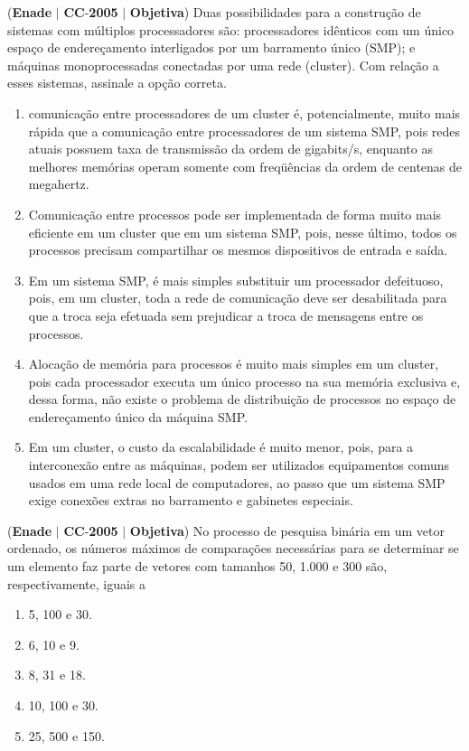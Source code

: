 \documentclass{exam}
\begin{document}
\begin{questions}
\question (\textbf{Enade} $|$ \textbf{CC}-\textbf{2005} $|$ \textbf{Objetiva})
Duas possibilidades para a construção de sistemas com múltiplos
processadores são: processadores idênticos com um único espaço de
endereçamento interligados por um barramento único (SMP); e
máquinas monoprocessadas conectadas por uma rede (cluster). Com
relação a esses sistemas, assinale a opção correta.
	\begin{enumerate}[label=\alph*)]
		\item  comunicação entre processadores de um cluster é,
potencialmente, muito mais rápida que a comunicação entre
processadores de um sistema SMP, pois redes atuais possuem
taxa de transmissão da ordem de gigabits/s, enquanto as
melhores memórias operam somente com freqüências da ordem
de centenas de megahertz.
		\item  Comunicação entre processos pode ser implementada de forma
muito mais eficiente em um cluster que em um sistema SMP,
pois, nesse último, todos os processos precisam compartilhar os
mesmos dispositivos de entrada e saída.
		\item  Em um sistema SMP, é mais simples substituir um processador
defeituoso, pois, em um cluster, toda a rede de comunicação
deve ser desabilitada para que a troca seja efetuada sem
prejudicar a troca de mensagens entre os processos.
		\item  Alocação de memória para processos é muito mais simples em
um cluster, pois cada processador executa um único processo na
sua memória exclusiva e, dessa forma, não existe o problema de
distribuição de processos no espaço de endereçamento único da
máquina SMP.
		\item  Em um cluster, o custo da escalabilidade é muito menor, pois,
para a interconexão entre as máquinas, podem ser utilizados
equipamentos comuns usados em uma rede local de
computadores, ao passo que um sistema SMP exige conexões
extras no barramento e gabinetes especiais.
	\end{enumerate}

\question (\textbf{Enade} $|$ \textbf{CC}-\textbf{2005} $|$ \textbf{Objetiva})
No processo de pesquisa binária em um vetor ordenado, os
números máximos de comparações necessárias para se
determinar se um elemento faz parte de vetores com tamanhos
50, 1.000 e 300 são, respectivamente, iguais a
	\begin{enumerate}[label=\alph*)]
		\item  5, 100 e 30.
		\item  6, 10 e 9.
		\item  8, 31 e 18.
		\item  10, 100 e 30.
		\item  25, 500 e 150.
	\end{enumerate}


\end{questions}
\end{document}
